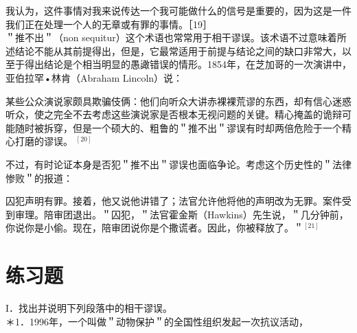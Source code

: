 我认为，这件事情对我来说传达一个我可能做什么的信号是重要的，因为这是一件我们正在处理一个人的无章或有罪的事情。［19］\\
＂推不出＂（non sequitur）这个术语也常常用于相干谬误。该术语不过意味着所述结论不能从其前提得出，但是，它最常适用于前提与结论之间的缺口非常大，以至于得出结论是个相当明显的愚譀错误的情形。1854年，在芝加哥的一次演讲中，亚伯拉罕•林肯（Abraham Lincoln）说：

\begin{displayquote}
某些公众演说家颇具欺骗伎俩：他们向听众大讲赤裸裸荒谬的东西，却有信心迷惑听众，使之完全不去考虑这些演说家是否根本无视问题的关键。精心掩盖的诡辩可能随时被拆穿，但是一个硕大的、粗鲁的＂推不出＂谬误有时却两倍危险于一个精心打磨的谬误。 ${ }^{[20]}$
\end{displayquote}

不过，有时论证本身是否犯＂推不出＂谬误也面临争论。考虑这个历史性的＂法律惨败＂的报道：

囚犯声明有罪。接着，他又说他讲错了；法官允许他将他的声明改为无罪。案件受到审理。陪审团退出。＂囚犯，＂法官霍金斯（Hawkins）先生说，＂几分钟前，你说你是小偷。现在，陪审团说你是个撒谎者。因此，你被释放了。＂${ }^{[21]}$

\section*{练习题}
I．找出并说明下列段落中的相干谬误。\\
＊1．1996年，一个叫做＂动物保护＂的全国性组织发起一次抗议活动，

